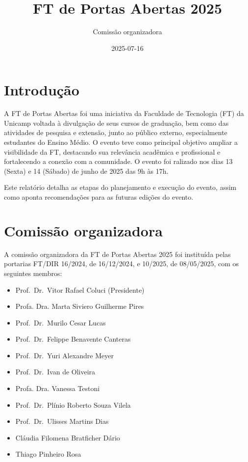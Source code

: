 \documentclass[
  letterpaper,
  DIV=11,
  numbers=noendperiod]{scrreprt}
\title{FT de Portas Abertas 2025}
\author{Comissão organizadora}
\date{2025-07-16}
\renewcommand*\contentsname{Table of contents}
\newcommand\contentsname{Table of contents}
\begin{document}
\maketitle

\renewcommand*\contentsname{Table of contents}
{
\hypersetup{linkcolor=}
\setcounter{tocdepth}{2}
\tableofcontents
}


\chapter{Introdução}\label{introduuxe7uxe3o}

A FT de Portas Abertas foi uma iniciativa da Faculdade de Tecnologia
(FT) da Unicamp voltada à divulgação de seus cursos de graduação, bem
como das atividades de pesquisa e extensão, junto ao público externo,
especialmente estudantes do Ensino Médio. O evento teve como principal
objetivo ampliar a visibilidade da FT, destacando sua relevância
acadêmica e profissional e fortalecendo a conexão com a comunidade. O
evento foi ralizado nos dias 13 (Sexta) e 14 (Sábado) de junho de 2025
das 9h às 17h.

Este relatório detalha as etapas do planejamento e execução do evento,
assim como aponta recomendações para as futuras edições do evento.


\chapter{Comissão organizadora}\label{comissuxe3o-organizadora}

A comissão organizadora da FT de Portas Abertas 2025 foi instituída
pelas portarias FT/DIR 16/2024, de 16/12/2024, e 10/2025, de 08/05/2025,
com os seguintes membros:

\begin{itemize}
\item
  Prof.~Dr.~Vitor Rafael Coluci (Presidente)
\item
  Profa. Dra. Marta Siviero Guilherme Pires
\item
  Prof.~Dr.~Murilo Cesar Lucas
\item
  Prof.~Dr.~Felippe Benavente Canteras
\item
  Prof.~Dr.~Yuri Alexandre Meyer
\item
  Prof.~Dr.~Ivan de Oliveira
\item
  Profa. Dra. Vanessa Testoni
\item
  Prof.~Dr.~Plínio Roberto Souza Vilela
\item
  Prof.~Dr.~Ulisses Martins Dias
\item
  Cláudia Filomena Bratficher Dário
\item
  Thiago Pinheiro Rosa
\end{itemize}
\end{document}
